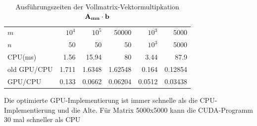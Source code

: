 \begin{table}
\renewcommand{\arraystretch}{1.3}
\caption{Ausführungszeiten der Vollmatrix-Vektormultipkation $ \bf{A_{mn} } \cdot \bf b$}
\label{tab_shared_memory}
\centering
\begin{tabular}{|l||r|r|r|r|r|}

\hline
	$m$& $10^4$ & $10^5$ & 50000& $10^3 $ & 5000\\
    $n$& 50& 50& 50& $10^3$ & 5000 \\

\hline
\hline
CPU(ms)& 1.56&    15.94& 				80&      3.44& 87.9\\

old GPU/CPU& 1.711& 1.6348&   1.62548&  0.164&  0.12854\\

GPU/CPU & 0.133& 0.0662&     0.06204&   0.0512& 0.03438\\


\hline
\end{tabular}
\end{table}
Die optimierte GPU-Implementierung ist immer schnelle als die CPU-Implementierung  und die Alte. Für Matrix 5000x5000 kann die CUDA-Programm 30 mal schneller als CPU

